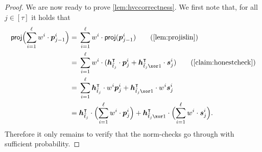 \begin{proof}

We are now ready to prove \autoref{lem:hvccorrectness}.
We first note that, for all $j\in[\tau]$ it holds that
\begin{align*}
  \proj\Bigl(\sum_{i=1}^{\ell}w^i\cdot\vec{p}_{j-1}^i\Bigr) ={}&\sum_{i=1}^{\ell}w^i\cdot\proj(\vec{p}_{j-1}^i)\tag{\autoref{lem:projislin}}\\
  ={}&\sum_{i=1}^{\ell}w^i\cdot(\vec{h}_{\tilde t_j}^\intercal\cdot \vec{p}^i_{j} + \vec{h}_{\tilde t_j\xor 1}^\intercal \cdot \vec{s}^i_{j})\tag{\autoref{claim:honestcheck}}\\
  ={}&\sum_{i=1}^{\ell}\vec{h}_{\tilde t_j}^\intercal\cdot w^i \vec{p}^i_{j} + \vec{h}_{\tilde t_j\xor 1}^\intercal\cdot w^i  \vec{s}^i_{j}\\  
  ={}& \vec{h}_{\tilde t_j}^\intercal\cdot \Bigl(\sum_{i=1}^{\ell}w^i\cdot\vec{p}^i_{j}\Bigr) + \vec{h}_{\tilde t_j \xor 1}^\intercal \cdot \Bigl(\sum_{i=1}^{\ell}w^i\cdot\vec{s}^i_{j}\Bigr).
\end{align*}
Therefore it only remains to verify that the norm-checks go through with sufficient probability.
\end{proof}
